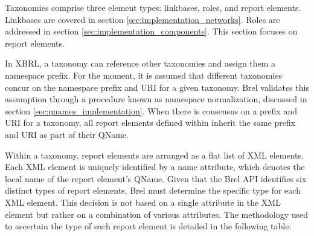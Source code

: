 Taxonomies comprise three element types: linkbases, roles, and report elements.
Linkbases are covered in section \ref{sec:implementation_networks}.
Roles are addressed in section \ref{sec:implementation_components}.
This section focuses on report elements.

In XBRL, a taxonomy can reference other taxonomies and assign them a namespace prefix.
For the moment, it is assumed that different taxonomies concur on the namespace prefix and URI for a given taxonomy.
Brel validates this assumption through a procedure known as namespace normalization, discussed in section \ref{sec:qnames_implementation}.
When there is consensus on a prefix and URI for a taxonomy, all report elements defined within inherit the same prefix and URI as part of their QName.

Within a taxonomy, report elements are arranged as a flat list of XML elements.
Each XML element is uniquely identified by a name attribute, which denotes the local name of the report element's QName.
Given that the Brel API identifies six distinct types of report elements, Brel must determine the specific type for each XML element.
This decision is not based on a single attribute in the XML element but rather on a combination of various attributes.
The methodology used to ascertain the type of each report element is detailed in the following table:

\begin{table}[H]
    \centering
    \caption{Determining the type of report element}
    \label{tab:determining_report_element_type}
\end{table}


